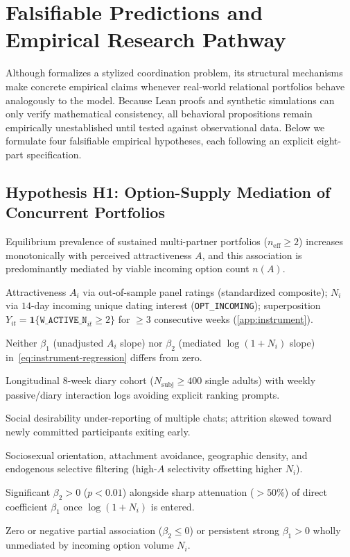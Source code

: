 \section{Falsifiable Predictions and Empirical Research Pathway}
\label{sec:hypotheses}

Although \RST{} formalizes a stylized coordination problem, its structural mechanisms make
concrete empirical claims whenever real-world relational portfolios behave analogously
to the model. Because Lean proofs and synthetic simulations can only verify mathematical
consistency, all behavioral propositions remain empirically unestablished until tested
against observational data. Below we formulate four falsifiable empirical hypotheses, each
following an explicit eight-part specification.

\subsection{Hypothesis H1: Option-Supply Mediation of Concurrent Portfolios}
\label{subsec:hyp-h1}

\noindent\layerempiric{}
\begin{description}[leftmargin=1.4em,nosep]
  \item[Hypothesis statement:] Equilibrium prevalence of sustained multi-partner portfolios
        ($n_{\mathrm{eff}} \ge 2$) increases monotonically with perceived attractiveness $A$,
        and this association is predominantly mediated by viable incoming option count $n(A)$.
  \item[Construct operationalization:] Attractiveness $A_i$ via out-of-sample panel ratings
        (standardized composite); $N_i$ via $14$-day incoming unique dating interest
        (\texttt{OPT\_INCOMING}); superposition $Y_{it} = \mathbf{1}\{\texttt{W\_ACTIVE\_N}_{it} \ge 2\}$
        for $\ge 3$ consecutive weeks (\cref{app:instrument}).
  \item[Null hypothesis:] Neither $\beta_1$ (unadjusted $A_i$ slope) nor $\beta_2$ (mediated
        $\log(1 + N_i)$ slope) in~\eqref{eq:instrument-regression} differs from zero.
  \item[Minimal study design:] Longitudinal $8$-week diary cohort ($N_{\mathrm{subj}} \ge 400$
        single adults) with weekly passive/diary interaction logs avoiding explicit ranking prompts.
  \item[Exclusion and bias risks:] Social desirability under-reporting of multiple chats;
        attrition skewed toward newly committed participants exiting early.
  \item[Confounders:] Sociosexual orientation, attachment avoidance, geographic density,
        and endogenous selective filtering (high-$A$ selectivity offsetting higher $N_i$).
  \item[Confirmation criteria:] Significant $\beta_2 > 0$ ($p < 0.01$) alongside sharp
        attenuation ($>50\%$) of direct coefficient $\beta_1$ once $\log(1 + N_i)$ is entered.
  \item[Falsification conditions:] Zero or negative partial association ($\beta_2 \le 0$)
        or persistent strong $\beta_1 > 0$ wholly unmediated by incoming option volume $N_i$.
\end{description}

